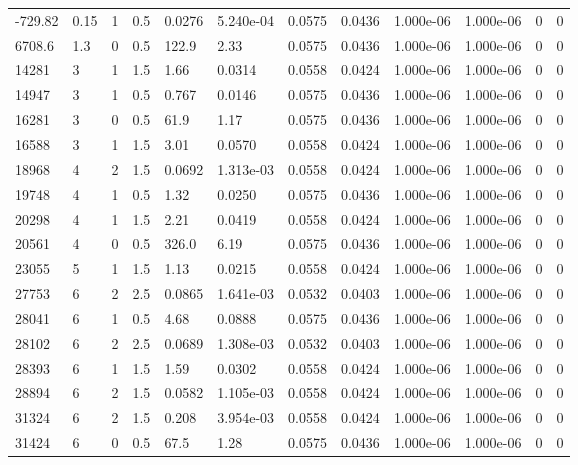 \documentclass[preview]{standalone}
\begin{document}
{{\begin{tabular}{L{1.2cm}C{1.2cm} C{0.3cm}C{0.5cm} C{1.4cm}C{1.4cm} C{1.4cm}C{1.4cm} C{1.6cm}C{1.6cm} C{1.6cm}C{1.6cm}}
  -729.82  &  0.15  & 1     & 0.5 &  0.0276  & 5.240e-04  &  0.0575&   0.0436& 1.000e-06 & 1.000e-06   &  0 & 0  \\ 
  6708.6  &   1.3  & 0     & 0.5 &  122.9  & 2.33  &  0.0575&   0.0436& 1.000e-06 & 1.000e-06   &  0 & 0  \\ 
  14281  &     3  & 1     & 1.5 &  1.66  & 0.0314  &  0.0558&   0.0424& 1.000e-06 & 1.000e-06   &  0 & 0  \\ 
  14947  &     3  & 1     & 0.5 &  0.767  & 0.0146  &  0.0575&   0.0436& 1.000e-06 & 1.000e-06   &  0 & 0  \\ 
  16281  &     3  & 0     & 0.5 &  61.9  & 1.17  &  0.0575&   0.0436& 1.000e-06 & 1.000e-06   &  0 & 0  \\ 
  16588  &     3  & 1     & 1.5 &  3.01  & 0.0570  &  0.0558&   0.0424& 1.000e-06 & 1.000e-06   &  0 & 0  \\ 
  18968  &     4  & 2     & 1.5 &  0.0692  & 1.313e-03  &  0.0558&   0.0424& 1.000e-06 & 1.000e-06   &  0 & 0  \\ 
  19748  &     4  & 1     & 0.5 &  1.32  & 0.0250  &  0.0575&   0.0436& 1.000e-06 & 1.000e-06   &  0 & 0  \\ 
  20298  &     4  & 1     & 1.5 &  2.21  & 0.0419  &  0.0558&   0.0424& 1.000e-06 & 1.000e-06   &  0 & 0  \\ 
  20561  &     4  & 0     & 0.5 &  326.0  & 6.19  &  0.0575&   0.0436& 1.000e-06 & 1.000e-06   &  0 & 0  \\ 
  23055  &     5  & 1     & 1.5 &  1.13  & 0.0215  &  0.0558&   0.0424& 1.000e-06 & 1.000e-06   &  0 & 0  \\ 
  27753  &     6  & 2     & 2.5 &  0.0865  & 1.641e-03  &  0.0532&   0.0403& 1.000e-06 & 1.000e-06   &  0 & 0  \\ 
  28041  &     6  & 1     & 0.5 &  4.68  & 0.0888  &  0.0575&   0.0436& 1.000e-06 & 1.000e-06   &  0 & 0  \\ 
  28102  &     6  & 2     & 2.5 &  0.0689  & 1.308e-03  &  0.0532&   0.0403& 1.000e-06 & 1.000e-06   &  0 & 0  \\ 
  28393  &     6  & 1     & 1.5 &  1.59  & 0.0302  &  0.0558&   0.0424& 1.000e-06 & 1.000e-06   &  0 & 0  \\ 
  28894  &     6  & 2     & 1.5 &  0.0582  & 1.105e-03  &  0.0558&   0.0424& 1.000e-06 & 1.000e-06   &  0 & 0  \\ 
  31324  &     6  & 2     & 1.5 &  0.208  & 3.954e-03  &  0.0558&   0.0424& 1.000e-06 & 1.000e-06   &  0 & 0  \\ 
  31424  &     6  & 0     & 0.5 &  67.5  & 1.28  &  0.0575&   0.0436& 1.000e-06 & 1.000e-06   &  0 & 0  \\ 

\end{tabular}}}
\end{document}
